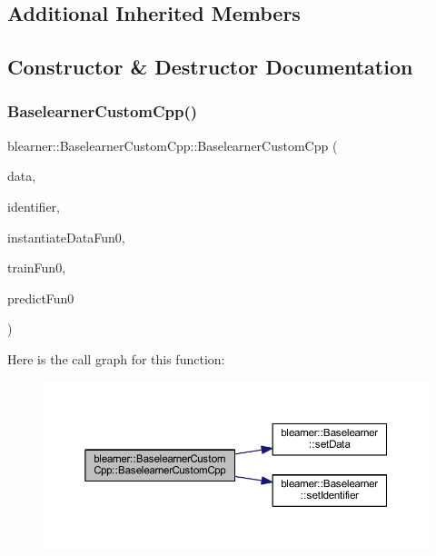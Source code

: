 \subsection*{Additional Inherited Members}


\subsection{Constructor \& Destructor Documentation}
\mbox{\label{classblearner_1_1_baselearner_custom_cpp_a7714c44164d0f763a861217ff2d53480}} 
\subsubsection{\texorpdfstring{Baselearner\+Custom\+Cpp()}{BaselearnerCustomCpp()}}
{\footnotesize\ttfamily blearner\+::\+Baselearner\+Custom\+Cpp\+::\+Baselearner\+Custom\+Cpp (\begin{DoxyParamCaption}\item[{\hyperlink{classdata_1_1_data}{data\+::\+Data} $\ast$}]{data,  }\item[{const std\+::string \&}]{identifier,  }\item[{S\+E\+XP}]{instantiate\+Data\+Fun0,  }\item[{S\+E\+XP}]{train\+Fun0,  }\item[{S\+E\+XP}]{predict\+Fun0 }\end{DoxyParamCaption})}

Here is the call graph for this function\+:\nopagebreak
\begin{figure}[H]
\begin{center}
\leavevmode
\includegraphics[width=350pt]{classblearner_1_1_baselearner_custom_cpp_a7714c44164d0f763a861217ff2d53480_cgraph}
\end{center}
\end{figure}
\mbox{\label{classblearner_1_1_baselearner_custom_cpp_a67aa938d71013c6e931d3edc563935bb}} 
